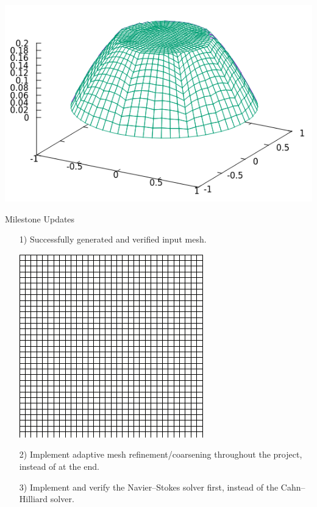\documentclass[9pt]{beamer}
\begin{document}
\begin{frame}
\begin{minipage}{.45\paperwidth}
	\end{minipage}%
	\begin{minipage}{.4\paperwidth}
		\centering
		\includegraphics[scale=.5]{Solu3-3.png}
	\end{minipage}
\end{frame}

\begin{frame}{Milestone Updates}
	\begin{itemize}
		\item[1)] Successfully generated and verified input mesh.
		
		\centering
		\includegraphics[scale=.6]{grid-1.png}
		
		\item[2)] Implement adaptive mesh refinement/coarsening throughout the project, instead of at the end.
		
		\item[3)] Implement and verify the Navier--Stokes solver first, instead of the Cahn--Hilliard solver.
	\end{itemize}
\end{frame}
\end{document}
